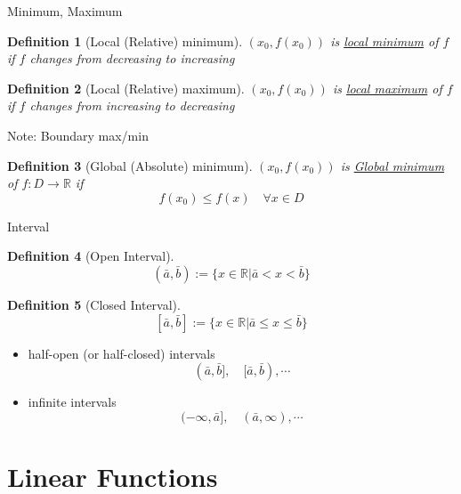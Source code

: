 \documentclass[a4paper,11pt]{article}
\newtheorem{defn}{Definition}
\begin{document}
\begin{frame}[t]{Minimum, Maximum}
	\begin{defn}
		[Local (Relative) minimum]
		$(x_0,f(x_0))$ is \uline{local minimum} of $f$ if $f$ changes from decreasing to increasing
	\end{defn}
	
	\begin{defn}
		[Local (Relative) maximum]
		$(x_0,f(x_0))$ is \uline{local maximum} of $f$ if $f$ changes from increasing to decreasing
	\end{defn}
	
	Note: Boundary max/min
	
	\begin{defn}
		[Global (Absolute) minimum]
		$(x_0,f(x_0))$ is \uline{Global minimum} of $f:D\rightarrow \mathbb{R}$ if \[
			f(x_0)\le f(x) \quad \forall x \in D
		\]
	\end{defn}
\end{frame}

\begin{frame}[t]{Interval}
	\begin{defn}
		[Open Interval]
		\[
			(\bar a,\bar b):=\{x\in \mathbb{R}\vert \bar a < x < \bar b \}
		\]
	\end{defn}
	
	\begin{defn}
		[Closed Interval]
		\[
			[\bar a,\bar b]:=\{x\in \mathbb{R}\vert \bar a \le x \le  \bar b \}
		\]
	\end{defn}
	
	\begin{itemize}
		\item half-open (or half-closed) intervals
		\[
			(\bar a, \bar b],\quad [\bar a, \bar b),\cdots
		\]
		\item infinite intervals
		\[
			(-\infty, \bar a],\quad (\bar a, \infty),\cdots
		\]
	\end{itemize}
\end{frame}

\section{Linear Functions} %
\label{sec:linear_functions}
\end{document}
